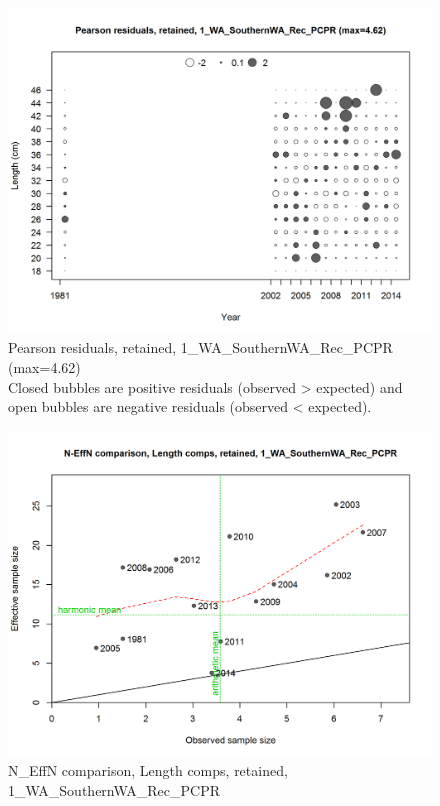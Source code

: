 \documentclass[12pt,]{article}
\begin{document}
\begin{figure}[htbp]
\centering
\includegraphics{./r4ss/plots_mod1/comp_lenfit_residsflt1mkt2.png}
\caption{Pearson residuals, retained, 1\_WA\_SouthernWA\_Rec\_PCPR
(max=4.62)\\
Closed bubbles are positive residuals (observed \textgreater{} expected)
and open bubbles are negative residuals (observed \textless{} expected).
\label{fig:mod1_2_comp_lenfit_residsflt1mkt2}}
\end{figure}

\begin{figure}[htbp]
\centering
\includegraphics{./r4ss/plots_mod1/comp_lenfit_sampsize_flt1mkt2.png}
\caption{N\_EffN comparison, Length comps, retained,
1\_WA\_SouthernWA\_Rec\_PCPR
\label{fig:mod1_3_comp_lenfit_sampsize_flt1mkt2}}
\end{figure}
\end{document}
